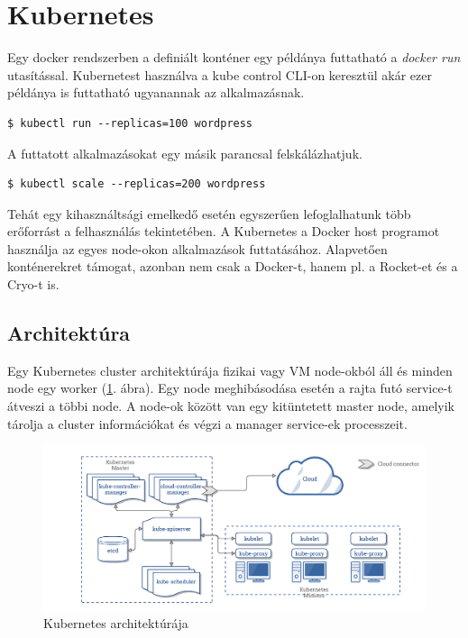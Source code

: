 \section{Kubernetes}
Egy docker rendszerben a definiált konténer egy példánya futtatható a \emph{docker run} utasítással. Kubernetest használva a kube control CLI-on keresztül akár ezer példánya is futtatható ugyanannak az alkalmazásnak.
\begin{lstlisting}[caption={Példa 100 alkalmazás indítására}]
$ kubectl run --replicas=100 wordpress
\end{lstlisting}
A futtatott alkalmazásokat egy másik parancsal felskálázhatjuk.
\begin{lstlisting}[caption={Példa alkalmazás skálázására}]
$ kubectl scale --replicas=200 wordpress
\end{lstlisting}
Tehát egy kihasználtsági emelkedő esetén egyszerűen lefoglalhatunk több erőforrást a felhasználás tekintetében.
A Kubernetes a Docker host programot használja az egyes node-okon alkalmazások futtatásához. Alapvetően konténerekret támogat, azonban nem csak a Docker-t, hanem pl. a Rocket-et és a Cryo-t is.
\subsection{Architektúra}
Egy Kubernetes cluster architektúrája fizikai vagy VM node-okból áll és minden node egy worker (\ref{fig:kubearch}. ábra). Egy node meghibásodása esetén a rajta futó service-t átveszi a többi node. A node-ok között van egy kitüntetett master node, amelyik tárolja a cluster információkat és végzi a manager service-ek processzeit.

\begin{figure}
	\centering
	\includegraphics[width=\linewidth]{figures/kube_arch.png}
	\caption{Kubernetes architektúrája \cite{kube-arch}}
	\label{fig:kubearch}
\end{figure}

